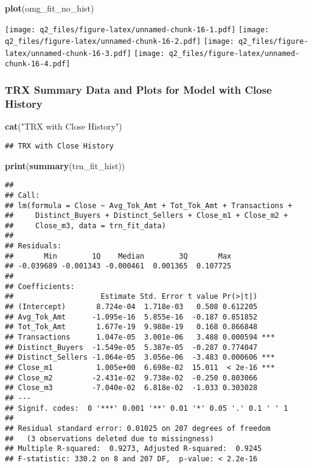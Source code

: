 \documentclass[]{article}
\newenvironment{Shaded}{\begin{snugshade}}{\end{snugshade}}
\newcommand{\KeywordTok}[1]{\textcolor[rgb]{0.13,0.29,0.53}{\textbf{#1}}}
\newcommand{\StringTok}[1]{\textcolor[rgb]{0.31,0.60,0.02}{#1}}
\newcommand{\NormalTok}[1]{#1}
\begin{document}
\begin{Shaded}
\begin{Highlighting}[]
\KeywordTok{plot}\NormalTok{(omg_fit_no_hist)}
\end{Highlighting}
\end{Shaded}

\texttt{[image: q2\_files/figure-latex/unnamed-chunk-16-1.pdf]}
\texttt{[image: q2\_files/figure-latex/unnamed-chunk-16-2.pdf]}
\texttt{[image: q2\_files/figure-latex/unnamed-chunk-16-3.pdf]}
\texttt{[image: q2\_files/figure-latex/unnamed-chunk-16-4.pdf]}

\subsubsection{TRX Summary Data and Plots for Model with Close
History}\label{trx-summary-data-and-plots-for-model-with-close-history}

\begin{Shaded}
\begin{Highlighting}[]
\KeywordTok{cat}\NormalTok{(}\StringTok{"TRX with Close History"}\NormalTok{)}
\end{Highlighting}
\end{Shaded}

\begin{verbatim}
## TRX with Close History
\end{verbatim}

\begin{Shaded}
\begin{Highlighting}[]
\KeywordTok{print}\NormalTok{(}\KeywordTok{summary}\NormalTok{(trn_fit_hist))}
\end{Highlighting}
\end{Shaded}

\begin{verbatim}
## 
## Call:
## lm(formula = Close ~ Avg_Tok_Amt + Tot_Tok_Amt + Transactions + 
##     Distinct_Buyers + Distinct_Sellers + Close_m1 + Close_m2 + 
##     Close_m3, data = trn_fit_data)
## 
## Residuals:
##       Min        1Q    Median        3Q       Max 
## -0.039689 -0.001343 -0.000461  0.001365  0.107725 
## 
## Coefficients:
##                    Estimate Std. Error t value Pr(>|t|)    
## (Intercept)       8.724e-04  1.718e-03   0.508 0.612205    
## Avg_Tok_Amt      -1.095e-16  5.855e-16  -0.187 0.851852    
## Tot_Tok_Amt       1.677e-19  9.988e-19   0.168 0.866848    
## Transactions      1.047e-05  3.001e-06   3.488 0.000594 ***
## Distinct_Buyers  -1.549e-05  5.387e-05  -0.287 0.774047    
## Distinct_Sellers -1.064e-05  3.056e-06  -3.483 0.000606 ***
## Close_m1          1.005e+00  6.698e-02  15.011  < 2e-16 ***
## Close_m2         -2.431e-02  9.738e-02  -0.250 0.803066    
## Close_m3         -7.040e-02  6.818e-02  -1.033 0.303028    
## ---
## Signif. codes:  0 '***' 0.001 '**' 0.01 '*' 0.05 '.' 0.1 ' ' 1
## 
## Residual standard error: 0.01025 on 207 degrees of freedom
##   (3 observations deleted due to missingness)
## Multiple R-squared:  0.9273, Adjusted R-squared:  0.9245 
## F-statistic: 330.2 on 8 and 207 DF,  p-value: < 2.2e-16
\end{verbatim}
\end{document}
